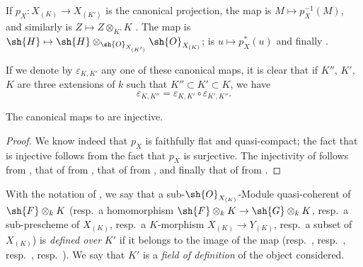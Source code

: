 If $p_X:X_{(K)}\to X_{(K')}$ is the canonical projection, the map  is $M\mapsto p_X^{-1}(M)$, and similarly  is $Z\mapsto Z\otimes_{K'} K$ .
The map  is $\sh{H}\mapsto\sh{H}\otimes_{\sh{O}_{X_{(K')}}}\sh{O}_{X_{(K)}}$;  is $u\mapsto p_X^*(u)$ and finally .

If we denote by $\varepsilon_{K,K'}$ any one of these canonical maps, it is clear that if $K''$, $K'$, $K$ are three extensions of $k$ such that $K''\subset K'\subset K$, we have
\[
\tag{4.8.2.6}
  \varepsilon_{K,K''} = \varepsilon_{K,K'}\circ\varepsilon_{K',K''}.
\]

\begin{proposition}[4.8.3]
\label{IV.4.8.3}
The canonical maps  to  are injective.
\end{proposition}

\begin{proof}
We know indeed that $p_X$ is faithfully flat and quasi-compact; the fact that  is injective follows from the fact that $p_X$ is surjective.
The injectivity of  follows from , that of  from , that of  from , and finally that of  from .
\end{proof}


\begin{definition}[4.8.4]
\label{IV.4.8.4}
With the notation of , we say that a sub-$\sh{O}_{X_{(K)}}$-Module quasi-coherent of $\sh{F}\otimes_k K$ (resp.\ a homomorphism $\sh{F}\otimes_k K\to\sh{G}\otimes_k K$, resp.\ a sub-prescheme of $X_{(K)}$, resp.\ a $K$-morphism $X_{(K)}\to Y_{(K)}$, resp.\ a subset of $X_{(K)}$) is \emph{defined over} $K'$ if it belongs to the image of the map  (resp.\ , resp.\ , resp.\ , resp.\ ).
We say that $K'$ is a \emph{field of definition} of the object considered.
\end{definition}

